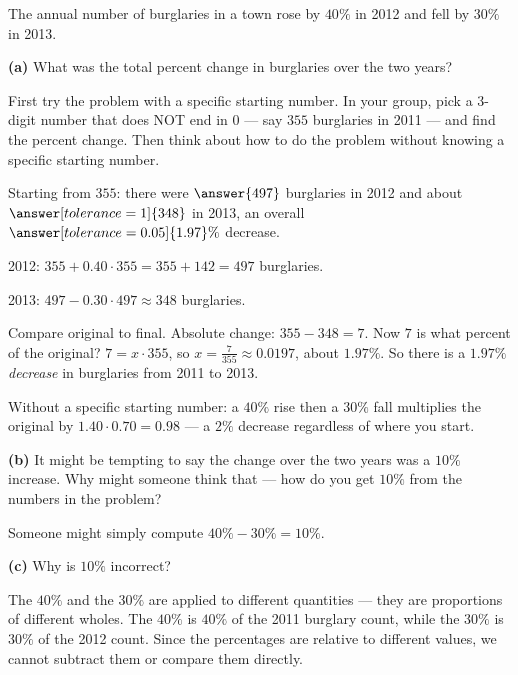 \documentclass[12pt]{ximera}
\begin{document}
\begin{problem}
The annual number of burglaries in a town rose by $40\%$ in 2012 and fell by $30\%$
in 2013.

\begin{prompt}
\textbf{(a)} What was the total percent change in burglaries over the two years?

First try the problem with a specific starting number. In your group, pick a 3-digit
number that does NOT end in $0$ --- say $355$ burglaries in 2011 --- and find the
percent change. Then think about how to do the problem without knowing a specific
starting number.

Starting from $355$: there were $\answer{497}$ burglaries in 2012 and about
$\answer[tolerance=1]{348}$ in 2013, an overall
$\answer[tolerance=0.05]{1.97}\%$ decrease.

\begin{solution}
2012: $355 + 0.40 \cdot 355 = 355 + 142 = 497$ burglaries.

2013: $497 - 0.30 \cdot 497 \approx 348$ burglaries.

Compare original to final. Absolute change: $355 - 348 = 7$. Now $7$ is what percent
of the original? $7 = x \cdot 355$, so $x = \frac{7}{355} \approx 0.0197$, about
$1.97\%$. So there is a $1.97\%$ \emph{decrease} in burglaries from 2011 to 2013.

Without a specific starting number: a $40\%$ rise then a $30\%$ fall multiplies the
original by $1.40 \cdot 0.70 = 0.98$ --- a $2\%$ decrease regardless of where you
start.
\end{solution}
\end{prompt}

\begin{prompt}
\textbf{(b)} It might be tempting to say the change over the two years was a $10\%$
increase. Why might someone think that --- how do you get $10\%$ from the numbers in
the problem?
\begin{freeResponse}
\end{freeResponse}

\begin{solution}
Someone might simply compute $40\% - 30\% = 10\%$.
\end{solution}
\end{prompt}

\begin{prompt}
\textbf{(c)} Why is $10\%$ incorrect?
\begin{freeResponse}
\end{freeResponse}

\begin{solution}
The $40\%$ and the $30\%$ are applied to different quantities --- they are
proportions of different wholes. The $40\%$ is $40\%$ of the 2011 burglary count,
while the $30\%$ is $30\%$ of the 2012 count. Since the percentages are relative to
different values, we cannot subtract them or compare them directly.
\end{solution}
\end{prompt}
\end{problem}
\end{document}
